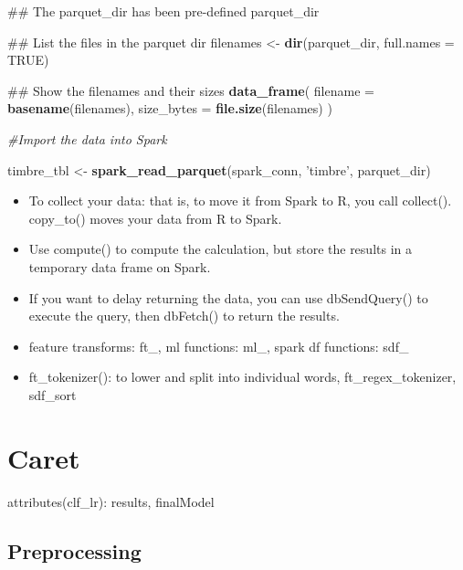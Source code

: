 \documentclass[]{book}
\newenvironment{Shaded}{\begin{snugshade}}{\end{snugshade}}
\newcommand{\KeywordTok}[1]{\textcolor[rgb]{0.13,0.29,0.53}{\textbf{#1}}}
\newcommand{\DataTypeTok}[1]{\textcolor[rgb]{0.13,0.29,0.53}{#1}}
\newcommand{\StringTok}[1]{\textcolor[rgb]{0.31,0.60,0.02}{#1}}
\newcommand{\CommentTok}[1]{\textcolor[rgb]{0.56,0.35,0.01}{\textit{#1}}}
\newcommand{\OtherTok}[1]{\textcolor[rgb]{0.56,0.35,0.01}{#1}}
\newcommand{\NormalTok}[1]{#1}
\theoremstyle{definition}
\theoremstyle{definition}
\theoremstyle{definition}
\theoremstyle{remark}
\begin{document}
\begin{Shaded}
\begin{Highlighting}[]
\NormalTok{## The parquet_dir has been pre-defined}
\NormalTok{parquet_dir}

\NormalTok{## List the files in the parquet dir}
\NormalTok{filenames <-}\StringTok{ }\KeywordTok{dir}\NormalTok{(parquet_dir, }\DataTypeTok{full.names =} \OtherTok{TRUE}\NormalTok{)}

\NormalTok{## Show the filenames and their sizes}
\KeywordTok{data_frame}\NormalTok{(}
  \DataTypeTok{filename =} \KeywordTok{basename}\NormalTok{(filenames),}
  \DataTypeTok{size_bytes =} \KeywordTok{file.size}\NormalTok{(filenames)}
\NormalTok{)}

\CommentTok{#Import the data into Spark}

\NormalTok{timbre_tbl <-}\StringTok{ }\KeywordTok{spark_read_parquet}\NormalTok{(spark_conn, }\StringTok{'timbre'}\NormalTok{, parquet_dir)}
\end{Highlighting}
\end{Shaded}

\begin{itemize}
\item
  To collect your data: that is, to move it from Spark to R, you call
  collect(). copy\_to() moves your data from R to Spark.
\item
  Use compute() to compute the calculation, but store the results in a
  temporary data frame on Spark.
\item
  If you want to delay returning the data, you can use dbSendQuery() to
  execute the query, then dbFetch() to return the results.
\item
  feature transforms: ft\_, ml functions: ml\_, spark df functions:
  sdf\_
\item
  ft\_tokenizer(): to lower and split into individual words,
  ft\_regex\_tokenizer, sdf\_sort
\end{itemize}

\section{Caret}\label{caret}

attributes(clf\_lr): results, finalModel

\subsection{Preprocessing}\label{preprocessing}
\end{document}
